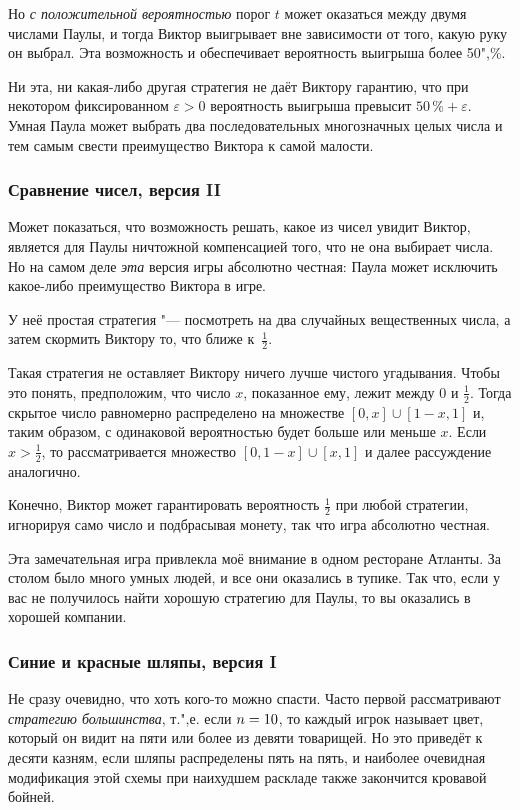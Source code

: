 \documentclass[twoside]{book}
\begin{document}
Но \emph{с положительной вероятностью} порог $t$ может оказаться между двумя числами Паулы, и тогда Виктор выигрывает вне зависимости от того, какую руку он выбрал.
Эта возможность и обеспечивает вероятность выигрыша более 50",\%.\heart

Ни эта, ни какая-либо другая стратегия не даёт Виктору гарантию, что при некотором фиксированном $\varepsilon>0$ вероятность выигрыша превысит $50\,\%+\varepsilon$.
Умная Паула может выбрать два последовательных многозначных целых числа и тем самым свести преимущество Виктора к самой малости.

\subsubsection*{Сравнение чисел, версия II}%

Может показаться, что возможность решать, какое из чисел увидит Виктор, является для Паулы ничтожной компенсацией того, что не она выбирает числа.
Но на самом деле \emph{эта} версия игры абсолютно честная:
Паула может исключить какое-либо преимущество Виктора в игре.

У неё простая стратегия "--- посмотреть на два случайных вещественных числа, а затем скормить Виктору то, что ближе к~$\tfrac12$.

Такая стратегия не оставляет Виктору ничего лучше чистого угадывания.
Чтобы это понять, предположим, что число $x$, показанное ему, лежит между $0$ и $\tfrac12$.
Тогда скрытое число равномерно распределено на множестве $[0,x]\cup [1-x, 1]$ и, таким образом, с одинаковой вероятностью будет больше или меньше $x$.
Если $x>\tfrac12$, то рассматривается множество $[0, 1-x]\cup [x, 1]$ и далее рассуждение аналогично.

Конечно, Виктор может гарантировать вероятность $\tfrac12$ при любой стратегии, игнорируя само число и подбрасывая монету, так что игра абсолютно честная.
\heart

Эта замечательная игра привлекла моё внимание в одном ресторане Атланты.
За столом было много умных людей, и все они оказались в тупике.
Так что, если у вас не получилось найти хорошую стратегию для Паулы, то вы оказались в хорошей компании.

\subsubsection*{Синие и красные шляпы, версия I}%

Не сразу очевидно, что хоть кого-то можно спасти.
Часто первой рассматривают \emph{стратегию большинства},
т.",е. если $n\z=10$, то каждый игрок называет цвет, который он видит на пяти или более из девяти товарищей.
Но это приведёт к десяти казням, если шляпы распределены пять на пять, и наиболее очевидная модификация этой схемы при наихудшем раскладе также закончится кровавой бойней.
\end{document}
